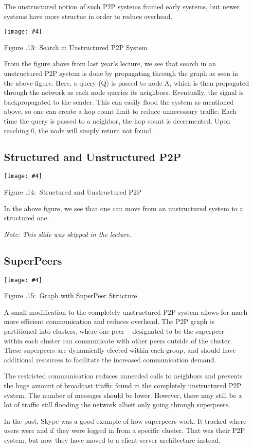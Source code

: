 \documentclass[twoside]{article}
\newcounter{lecnum}
\newcommand{\fig}[4]{
            \centerline{\texttt{[image: \#4]}}
            \begin{center}
            Figure \thelecnum.#1:~#3
            \end{center}
    }
\begin{document}
The unstructured notion of such P2P systems framed early systems, but newer systems have more structue in order to reduce overhead.

\fig{13}{0.3}{Search in Unstructured P2P System}{search.png}

From the figure above from last year's lecture, we see that search in an unstructured P2P system is done by propagating through the graph as seen in the above figure. Here, a query (Q) is passed to node A, which is then propagated through the network as each node queries its neighbors. Eventually, the signal is backpropagated to the sender. This can easily flood the system as mentioned above, so one can create a hop count limit to reduce unnecessary traffic. Each time the query is passed to a neighbor, the hop count is decremented. Upon reaching 0, the node will simply return not found. 


\subsection{Structured and Unstructured P2P}
\fig{14}{0.5}{Structured and Unstructured P2P}{structedAndUnstructured.png}

In the above figure, we see that one can move from an unstructured system to a structured one.

\textit{Note: This slide was skipped in the lecture.}


\subsection{SuperPeers}
\fig{15}{0.4}{Graph with SuperPeer Structure}{superpeer.png}

A small modification to the completely unstructured P2P system allows for much more efficient communication and reduces overhead. The P2P graph is partitioned into clusters, where one peer -- designated to be the superpeer -- within each cluster can communicate with other peers outside of the cluster. These superpeers are dynamically elected within each group, and should have additional resources to facilitate the increased communication demand. 

The restricted communication reduces unneeded calls to neighbors and prevents the huge amount of broadcast traffic found in the completely unstructured P2P system. The number of messages should be lower. However, there may still be a lot of traffic still flooding the network albeit only going through superpeers.

In the past, Skype was a good example of how superpeers work. It tracked where users were and if they were logged in from a specific cluster. That was their P2P system, but now they have moved to a client-server architecture instead.
\end{document}
